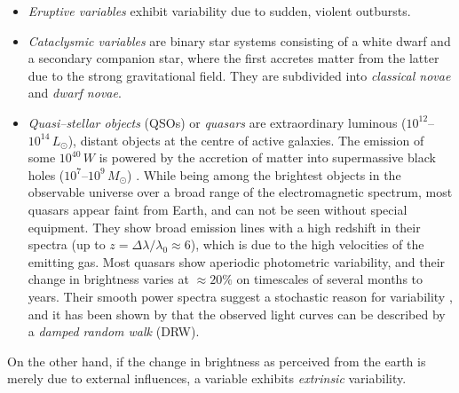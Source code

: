 \begin{itemize}
\item \emph{Eruptive variables} exhibit variability due to sudden, violent outbursts.
\item \emph{Cataclysmic variables} are binary star systems consisting of a white dwarf and a secondary companion star, where the first accretes matter from the latter due to the strong gravitational field. They are subdivided into \emph{classical novae} and \emph{dwarf novae}.


\item \emph{Quasi--stellar objects} (QSOs) or \emph{quasars} are extraordinary luminous ($10^{12}$--$10^{14} \, \unit{L_\odot}$), distant objects at the centre of active galaxies. The emission of some $10^{40} \, \unit{W}$ is powered by the accretion of matter into supermassive black holes ($10^7$--$10^9 \, \unit{M_\odot}$) \citep{hanslmeier2007}. While being among the brightest objects in the observable universe over a broad range of the electromagnetic spectrum, most quasars appear faint from Earth, and can not be seen without special equipment. They show broad emission lines with a high redshift in their spectra (up to $z  = \Delta \lambda / \lambda_0 \approx 6$), which is due to the high velocities of the emitting gas. Most quasars show aperiodic photometric variability, and their change in brightness varies at $\approx 20\%$ on timescales of several months to years. Their smooth power spectra suggest a stochastic reason for variability \citep{macleod2010}, and it has been shown by \citet{kozlowski2010} that the observed light curves can be described by a \emph{damped random walk} (DRW).


\end{itemize}

On the other hand, if the change in brightness as perceived from the earth is merely due to external influences, a variable exhibits \emph{extrinsic} variability.

